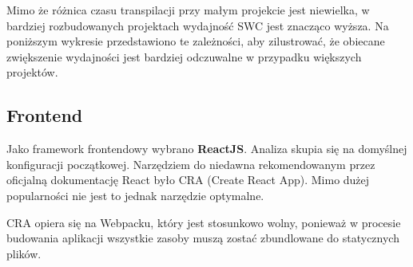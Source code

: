 \documentclass{article}
\begin{document}
Mimo że różnica czasu transpilacji przy małym projekcie jest niewielka, w bardziej rozbudowanych projektach wydajność SWC jest znacząco wyższa. Na poniższym wykresie przedstawiono te zależności, aby zilustrować, że obiecane zwiększenie wydajności jest bardziej odczuwalne w przypadku większych projektów.

\begin{center}
\end{center} 

\subsection{Frontend}

Jako framework frontendowy wybrano \textbf{ReactJS}. Analiza skupia się na domyślnej konfiguracji początkowej. Narzędziem do niedawna rekomendowanym przez oficjalną dokumentację React było CRA\cite{DevCra} (Create React App). Mimo dużej popularności nie jest to jednak narzędzie optymalne.

CRA opiera się na Webpacku, który jest stosunkowo wolny, ponieważ w procesie budowania aplikacji wszystkie zasoby muszą zostać zbundlowane do statycznych plików.
\end{document}
